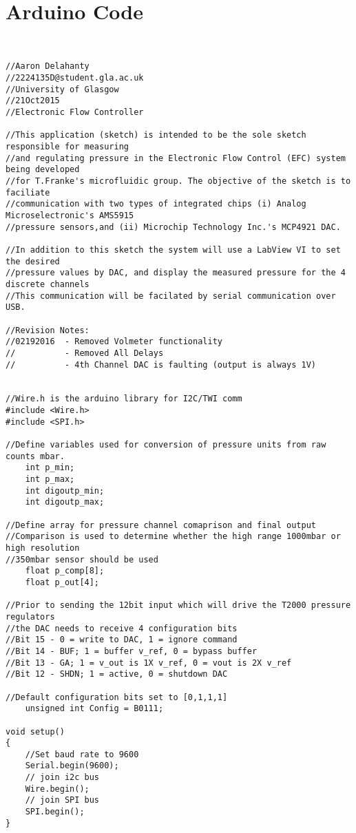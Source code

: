 \chapter{Arduino Code}
\scriptsize

\begin{lstlisting}

    
//Aaron Delahanty
//2224135D@student.gla.ac.uk
//University of Glasgow
//21Oct2015
//Electronic Flow Controller

//This application (sketch) is intended to be the sole sketch responsible for measuring 
//and regulating pressure in the Electronic Flow Control (EFC) system being developed 
//for T.Franke's microfluidic group. The objective of the sketch is to faciliate
//communication with two types of integrated chips (i) Analog Microselectronic's AMS5915
//pressure sensors,and (ii) Microchip Technology Inc.'s MCP4921 DAC.

//In addition to this sketch the system will use a LabView VI to set the desired 
//pressure values by DAC, and display the measured pressure for the 4 discrete channels
//This communication will be facilated by serial communication over USB.

//Revision Notes:
//02192016  - Removed Volmeter functionality
//          - Removed All Delays
//          - 4th Channel DAC is faulting (output is always 1V)


//Wire.h is the arduino library for I2C/TWI comm
#include <Wire.h>
#include <SPI.h>

//Define variables used for conversion of pressure units from raw counts mbar.
    int p_min;
    int p_max;
    int digoutp_min;
    int digoutp_max;

//Define array for pressure channel comaprison and final output
//Comparison is used to determine whether the high range 1000mbar or high resolution 
//350mbar sensor should be used
    float p_comp[8];
    float p_out[4];

//Prior to sending the 12bit input which will drive the T2000 pressure regulators
//the DAC needs to receive 4 configuration bits
//Bit 15 - 0 = write to DAC, 1 = ignore command
//Bit 14 - BUF; 1 = buffer v_ref, 0 = bypass buffer
//Bit 13 - GA; 1 = v_out is 1X v_ref, 0 = vout is 2X v_ref
//Bit 12 - SHDN; 1 = active, 0 = shutdown DAC

//Default configuration bits set to [0,1,1,1]
    unsigned int Config = B0111;

void setup()
{
    //Set baud rate to 9600 
    Serial.begin(9600);
    // join i2c bus
    Wire.begin(); 
    // join SPI bus
    SPI.begin();
}


\end{lstlisting}
